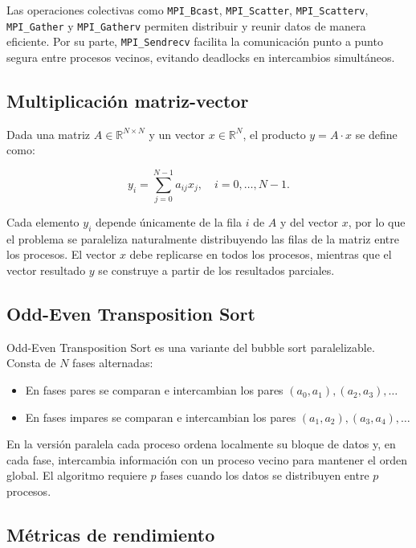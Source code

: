 \documentclass[12pt,a4paper]{article}
\begin{document}
Las operaciones colectivas como \texttt{MPI\_Bcast}, \texttt{MPI\_Scatter}, \texttt{MPI\_Scatterv}, \texttt{MPI\_Gather} y \texttt{MPI\_Gatherv} permiten distribuir y reunir datos de manera eficiente. Por su parte, \texttt{MPI\_Sendrecv} facilita la comunicación punto a punto segura entre procesos vecinos, evitando deadlocks en intercambios simultáneos.

\subsection{Multiplicación matriz-vector}

Dada una matriz $A \in \mathbb{R}^{N \times N}$ y un vector $x \in \mathbb{R}^{N}$, el producto $y = A \cdot x$ se define como:

\begin{equation}
    y_i = \sum_{j=0}^{N-1} a_{ij} x_j, \quad i = 0, \dots, N-1.
\end{equation}

Cada elemento $y_i$ depende únicamente de la fila $i$ de $A$ y del vector $x$, por lo que el problema se paraleliza naturalmente distribuyendo las filas de la matriz entre los procesos. El vector $x$ debe replicarse en todos los procesos, mientras que el vector resultado $y$ se construye a partir de los resultados parciales.

\subsection{Odd-Even Transposition Sort}

Odd-Even Transposition Sort es una variante del bubble sort paralelizable. Consta de $N$ fases alternadas:

\begin{itemize}
    \item En fases pares se comparan e intercambian los pares $(a_0,a_1), (a_2,a_3), \dots$
    \item En fases impares se comparan e intercambian los pares $(a_1,a_2), (a_3,a_4), \dots$
\end{itemize}

En la versión paralela cada proceso ordena localmente su bloque de datos y, en cada fase, intercambia información con un proceso vecino para mantener el orden global. El algoritmo requiere $p$ fases cuando los datos se distribuyen entre $p$ procesos.

\subsection{Métricas de rendimiento}
\end{document}
